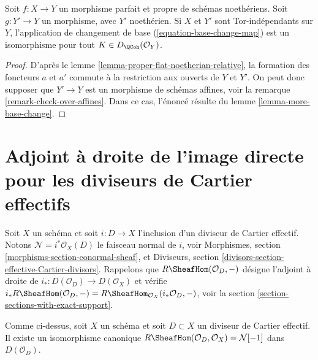 \begin{lemma}
\label{lemma-proper-perfect-base-change}
Soit $f : X \to Y$ un morphisme parfait et propre de schémas noethériens. Soit $g : Y' \to Y$ un morphisme, avec $Y'$ noethérien. Si $X$ et $Y'$ sont Tor-indépendants sur $Y$, l'application de changement de base (\ref{equation-base-change-map}) est un isomorphisme pour tout $K \in D_\QCoh(\mathcal{O}_Y)$.
\end{lemma}

\begin{proof}
D'après le lemme \ref{lemma-proper-flat-noetherian-relative}, la formation des foncteurs $a$ et $a'$ commute à la restriction aux ouverts de $Y$ et $Y'$. On peut donc supposer que $Y' \to Y$ est un morphisme de schémas affines, voir la remarque \ref{remark-check-over-affines}. Dans ce cas, l'énoncé résulte du lemme \ref{lemma-more-base-change}.
\end{proof}



\section{Adjoint à droite de l'image directe pour les diviseurs de Cartier effectifs}
\label{section-dualizing-Cartier}

\noindent
Soit $X$ un schéma et soit $i : D \to X$ l'inclusion d'un diviseur de Cartier effectif. Notons $\mathcal{N} = i^*\mathcal{O}_X(D)$ le faisceau normal de $i$, voir Morphismes, section \ref{morphisms-section-conormal-sheaf}, et Diviseurs, section \ref{divisors-section-effective-Cartier-divisors}. Rappelons que $R\SheafHom(\mathcal{O}_D, -)$ désigne l'adjoint à droite de $i_* : D(\mathcal{O}_D) \to D(\mathcal{O}_X)$ et vérifie $i_*R\SheafHom(\mathcal{O}_D, -) =
R\SheafHom_{\mathcal{O}_X}(i_*\mathcal{O}_D, -)$, voir la section \ref{section-sections-with-exact-support}.

\begin{lemma}
\label{lemma-compute-for-effective-Cartier}
Comme ci-dessus, soit $X$ un schéma et soit $D \subset X$ un diviseur de Cartier effectif. Il existe un isomorphisme canonique $R\SheafHom(\mathcal{O}_D, \mathcal{O}_X) = \mathcal{N}[-1]$ dans $D(\mathcal{O}_D)$.
\end{lemma}

